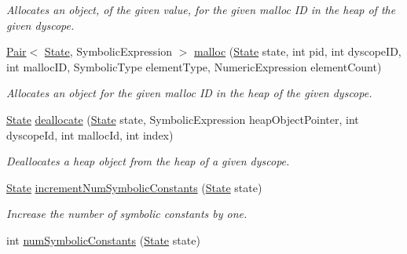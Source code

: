 \begin{DoxyCompactItemize}
\begin{DoxyCompactList}\small\item\em Allocates an object, of the given value, for the given malloc I\+D in the heap of the given dyscope. \end{DoxyCompactList}\item 
\hyperlink{classedu_1_1udel_1_1cis_1_1vsl_1_1civl_1_1util_1_1IF_1_1Pair}{Pair}$<$ \hyperlink{interfaceedu_1_1udel_1_1cis_1_1vsl_1_1civl_1_1state_1_1IF_1_1State}{State}, Symbolic\+Expression $>$ \hyperlink{interfaceedu_1_1udel_1_1cis_1_1vsl_1_1civl_1_1state_1_1IF_1_1StateFactory_ae7914fbfe856e913a2f9ad694ed01b9b}{malloc} (\hyperlink{interfaceedu_1_1udel_1_1cis_1_1vsl_1_1civl_1_1state_1_1IF_1_1State}{State} state, int pid, int dyscope\+I\+D, int malloc\+I\+D, Symbolic\+Type element\+Type, Numeric\+Expression element\+Count)
\begin{DoxyCompactList}\small\item\em Allocates an object for the given malloc I\+D in the heap of the given dyscope. \end{DoxyCompactList}\item 
\hyperlink{interfaceedu_1_1udel_1_1cis_1_1vsl_1_1civl_1_1state_1_1IF_1_1State}{State} \hyperlink{interfaceedu_1_1udel_1_1cis_1_1vsl_1_1civl_1_1state_1_1IF_1_1StateFactory_ae67ff5361d7dda8a7b1ca1b3a7d6ad48}{deallocate} (\hyperlink{interfaceedu_1_1udel_1_1cis_1_1vsl_1_1civl_1_1state_1_1IF_1_1State}{State} state, Symbolic\+Expression heap\+Object\+Pointer, int dyscope\+Id, int malloc\+Id, int index)
\begin{DoxyCompactList}\small\item\em Deallocates a heap object from the heap of a given dyscope. \end{DoxyCompactList}\item 
\hyperlink{interfaceedu_1_1udel_1_1cis_1_1vsl_1_1civl_1_1state_1_1IF_1_1State}{State} \hyperlink{interfaceedu_1_1udel_1_1cis_1_1vsl_1_1civl_1_1state_1_1IF_1_1StateFactory_a38d4a9ddfedabc175ca4f3339e429ab7}{increment\+Num\+Symbolic\+Constants} (\hyperlink{interfaceedu_1_1udel_1_1cis_1_1vsl_1_1civl_1_1state_1_1IF_1_1State}{State} state)
\begin{DoxyCompactList}\small\item\em Increase the number of symbolic constants by one. \end{DoxyCompactList}\item 
int \hyperlink{interfaceedu_1_1udel_1_1cis_1_1vsl_1_1civl_1_1state_1_1IF_1_1StateFactory_aa25cbfaca9b0e6a1d7aa7e15dc50ec87}{num\+Symbolic\+Constants} (\hyperlink{interfaceedu_1_1udel_1_1cis_1_1vsl_1_1civl_1_1state_1_1IF_1_1State}{State} state)

\end{DoxyCompactItemize}
